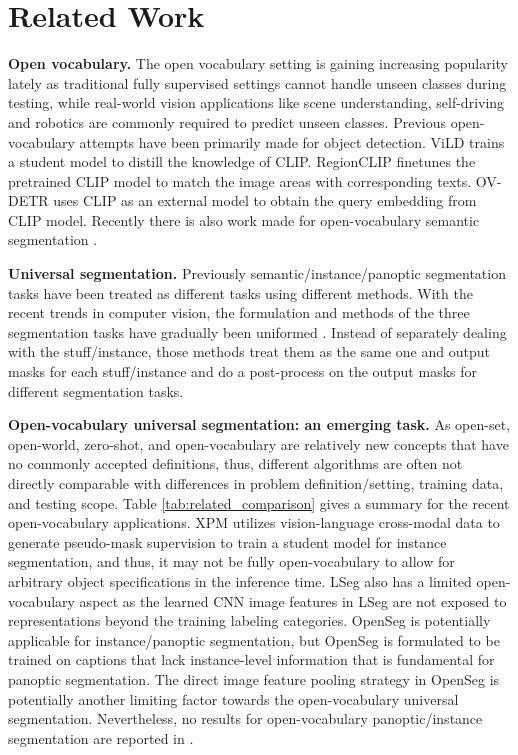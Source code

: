 \documentclass{article}
\theoremstyle{plain}
\theoremstyle{definition}
\theoremstyle{remark}
\begin{document}
\section{Related Work}



\textbf{Open vocabulary.} The open vocabulary setting is gaining increasing popularity lately as traditional fully supervised settings cannot handle unseen classes during testing, while real-world vision applications like scene understanding, self-driving and robotics are commonly required to predict unseen classes. Previous open-vocabulary attempts have been primarily made for object detection.
ViLD \citep{gu2022open} trains a student model to distill the knowledge of CLIP. RegionCLIP \citep{zhong2021regionclip} finetunes the pretrained CLIP model to match the image areas with corresponding texts. OV-DETR  \citep{zang2022open} uses CLIP as an external model to obtain the query embedding from CLIP model. Recently there is also work made for open-vocabulary semantic segmentation \citep{ghiasi2021open}. 

\textbf{Universal segmentation.} 
Previously semantic/instance/panoptic segmentation tasks have been treated as different tasks using different methods. With the recent trends in computer vision, the formulation and methods of the three segmentation tasks have gradually been uniformed \citep{cheng2021per, cheng2021masked}. Instead of separately dealing with the stuff/instance, those methods treat them as the same one and output masks for each stuff/instance and do a post-process on the output masks for different segmentation tasks.

\textbf{Open-vocabulary universal segmentation: an emerging task.} As open-set, open-world, zero-shot, and open-vocabulary are relatively new concepts that have no commonly accepted definitions, thus, different algorithms are often not directly comparable with differences in problem definition/setting, training data, and testing scope. Table \ref{tab:related_comparison} gives a summary for the recent open-vocabulary applications.
XPM \citep{huynh2022open} utilizes vision-language cross-modal data to generate pseudo-mask supervision to train a student model for instance segmentation, and thus, it may not be fully open-vocabulary to allow for arbitrary object specifications in the inference time. LSeg  \citep{li2022language} also has a limited open-vocabulary aspect as the learned CNN image features in LSeg  are not exposed to representations beyond the training labeling categories. OpenSeg \citep{ghiasi2021open} is potentially applicable for instance/panoptic segmentation, but OpenSeg is formulated to be trained on captions that lack instance-level information that is fundamental for panoptic segmentation.
The direct image feature pooling strategy in OpenSeg is potentially another limiting factor towards the open-vocabulary universal segmentation.
Nevertheless, no results for open-vocabulary panoptic/instance segmentation are reported in  \citep{ghiasi2021open}.  
\end{document}
